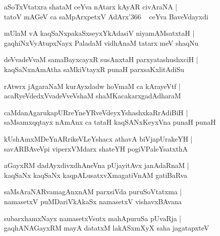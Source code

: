 \documentclass[twoside,12pt,openright]{book}
\newcounter{shloka}[chapter]
\begin{document}
\begin{shloka}%
aSoTxVtatxra shataM ceYva nAtarx kAyAR civAraNA |\\
tatoV mAGeV ca saMpArxpetxV AdArx\char'366 ~ ceYva BaveVdayxdi
\end{shloka}

\begin{shloka}%
mUlaM vA kaqSaNxpakaSxseyxYkAdasiV niyamAMsatxtaH |\\
gaqhiNxVyAtupxNayx PaladaM vidhAnaM tatarx meV shaqNu
\end{shloka}

\begin{shloka}%
deVvadeVvaM samaBayxcayxR susAnxtaH parxyatashushxciH |\\
kaqSaNxnAmAtha saMkiVtayxR punaH parxsaKxlitAdiSu
\end{shloka}

\begin{shloka}%
rAtwrx jAgaraNaM kurAyxdadw hoVmaM ca kArayeVtf |\\
acaRyeVdedxVvadeVveVshaM shaMKacakarxgadAdharaM 
\end{shloka}

\begin{shloka}%
caMdanAgarukapURreYneYRveVdeyxYshashxkaRrAdiBiH |\\
saMsamxqqtayx nAmAnx ca tataH kaqSANxKeyxVna punaH punaH 
\end{shloka}

\begin{shloka}%
kUshAmxMDeYnARrikeVLeYshacx athavA biVjapUrakeYH |\\
savARBAveVpi viperxVMdarx shateYH pogiVPaleYsatxthA 
\end{shloka}

\begin{shloka}%
aGayxRM dadAyxdivxdhAneVna pUjayitAvx janAdaRnaM |\\
kaqSaNx kaqSaNx kaqpALusatxvXmagatiVnAM gatiBaRva
\end{shloka}

\begin{shloka}%
saMsAraNARvamagAnxnAM parxsiVda puruSoVtatxma |\\
namasetxV puMDariVkAkaSx namasetxV vishavxBAvana 
\end{shloka}

\begin{shloka}%
subarxhamxNayx namasetxVsutx mahApuruSa pUvaRja |\\
gaqhANAGayxRM mayA datatxM lakASxmXyX saha jagatapxteV 
\end{shloka}
\end{document}
